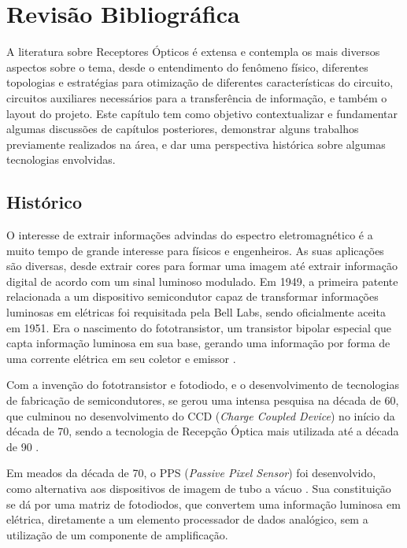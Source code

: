 \chapter[Revisão Bibliográfica]{Revisão Bibliográfica}

A literatura sobre Receptores Ópticos \'e extensa e contempla os mais diversos aspectos sobre o tema, desde o entendimento do fenômeno físico, diferentes topologias e estrat\'egias para otimização de diferentes características do circuito, circuitos auxiliares necessários para a transferência de informação, e tamb\'em o layout do projeto. Este capítulo tem como objetivo contextualizar e fundamentar algumas discussões de capítulos posteriores, demonstrar alguns trabalhos previamente realizados na área, e dar uma perspectiva histórica sobre algumas tecnologias envolvidas.
\section{Histórico}
O interesse de extrair informações advindas do espectro eletromagn\'etico \'e a muito tempo de grande interesse para físicos e engenheiros. As suas aplicações são diversas, desde extrair cores para formar uma imagem at\'e extrair informação digital de acordo com um sinal luminoso modulado.
Em 1949, a primeira patente relacionada a um dispositivo semicondutor capaz de transformar informações luminosas em el\'etricas foi requisitada pela Bell Labs, sendo oficialmente aceita em 1951. Era o nascimento do fototransistor, um transistor bipolar especial que capta informação luminosa em sua base, gerando uma informação por forma de uma corrente el\'etrica em seu coletor e emissor \cite{Shive}.

Com a invenção do fototransistor e fotodiodo, e o desenvolvimento de tecnologias de fabricação de semicondutores, se gerou uma intensa pesquisa na d\'ecada de 60, que culminou no desenvolvimento do CCD (\textit{Charge Coupled Device}) no início da d\'ecada de 70, sendo a tecnologia de Recepção Óptica mais utilizada at\'e a d\'ecada de 90 \cite{EstevaoCoelho, Andre}.

Em meados da d\'ecada de 70, o PPS (\textit{Passive Pixel Sensor}) foi desenvolvido, como alternativa aos dispositivos de imagem de tubo a vácuo \cite{Savvas}. Sua constituição se dá por uma matriz de fotodiodos, que convertem uma informação luminosa em el\'etrica, diretamente a um elemento processador de dados analógico, sem a utilização de um componente de amplificação.

